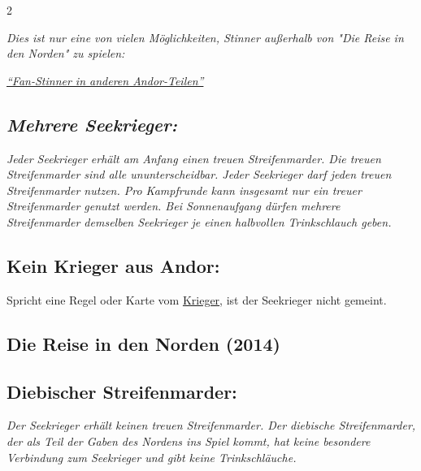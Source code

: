 \documentclass[10pt, a4paper, oneside]{book}
\newcommand{\fan}[1]{\textit{#1}}
\begin{document}
\begin{multicols*}{2}
\begin{nobgcolor}
\fan{Dies ist nur eine von vielen Möglichkeiten, Stinner außerhalb von "Die Reise in den Norden" zu spielen:}

\href{https://legenden-von-andor.de/forum/viewtopic.php?p=126785#p126785}
{\blacktriangleright \fan{\enquote{Fan-Stinner in anderen Andor-Teilen}}}








\subsection{\fan{Mehrere Seekrieger:}}

\fan{Jeder Seekrieger erhält am Anfang einen treuen Streifenmarder. Die treuen Streifenmarder sind alle ununterscheidbar. Jeder Seekrieger darf jeden treuen Streifenmarder nutzen. Pro Kampfrunde kann insgesamt nur ein treuer Streifenmarder genutzt werden. Bei Sonnenaufgang dürfen mehrere Streifenmarder demselben Seekrieger je einen halbvollen Trinkschlauch geben.}



\subsection{Kein Krieger aus Andor:}

Spricht eine Regel oder Karte vom \hyperref[krieger]{Krieger}, ist der Seekrieger nicht gemeint.



\end{nobgcolor}



\columnbreak




\begin{bgcolor}
\section{Die Reise in den Norden (2014)}

\subsection{Diebischer Streifenmarder:}

\fan{Der Seekrieger erhält keinen treuen Streifenmarder. Der diebische Streifenmarder, der als Teil der Gaben des Nordens ins Spiel kommt, hat keine besondere Verbindung zum Seekrieger und gibt keine Trinkschläuche.}




\end{bgcolor}
\end{multicols*}
\end{document}
